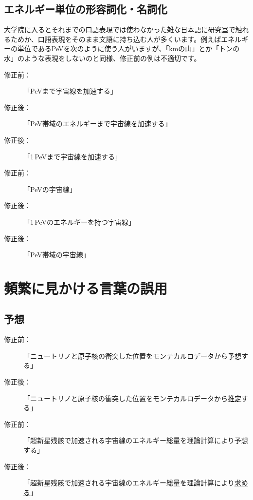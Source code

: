 \subsection{エネルギー単位の形容詞化・名詞化}

大学院に入るとそれまでの口語表現では使わなかった雑な日本語に研究室で触れるためか、口語表現をそのまま文語に持ち込む人が多くいます。例えばエネルギーの単位であるPeVを次のように使う人がいますが、「kmの山」とか「トンの水」のような表現をしないのと同様、修正前の例は不適切です。

\begin{description}
\item[修正前：]「PeVまで宇宙線を加速する」
\item[修正後：]「PeV帯域のエネルギーまで宇宙線を加速する」
\item[修正後：]「1\,PeVまで宇宙線を加速する」
\end{description}

\begin{description}
\item[修正前：]「PeVの宇宙線」
\item[修正後：]「1\,PeVのエネルギーを持つ宇宙線」
\item[修正後：]「PeV帯域の宇宙線」
\end{description}

\section{頻繁に見かける言葉の誤用}

\subsection{予想}

\begin{description}
\item[修正前：]「ニュートリノと原子核の衝突した位置をモンテカルロデータから予想する」
\item[修正後：]「ニュートリノと原子核の衝突した位置をモンテカルロデータから\underline{推定}する」
\end{description}
\begin{description}
\item[修正前：]「超新星残骸で加速される宇宙線のエネルギー総量を理論計算により予想する」
\item[修正後：]「超新星残骸で加速される宇宙線のエネルギー総量を理論計算により\underline{求める}」
\end{description}

